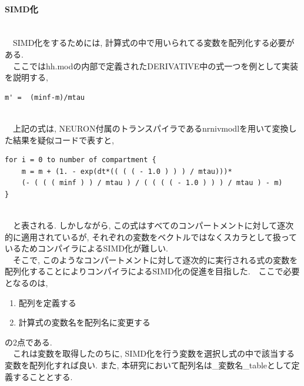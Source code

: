 \paragraph{SIMD化}~\\
　SIMD化をするためには, 計算式の中で用いられてる変数を配列化する必要がある.\\
　ここではhh.modの内部で定義されたDERIVATIVE中の式一つを例として実装を説明する,\\
\begin{table}[htb]
  \begin{center}
{\footnotesize
\begin{framed}
\begin{verbatim}
m' =  (minf-m)/mtau
\end{verbatim}
\end{framed}
}
\end{center}
\end{table}~\\
　上記の式は, NEURON付属のトランスパイラであるnrnivmodlを用いて変換した結果を疑似コードで表すと,\\
\clearpage
\begin{table}[htb]
  \begin{center}
{\footnotesize
\begin{framed}
\begin{verbatim}
for i = 0 to number of compartment {
    m = m + (1. - exp(dt*(( ( ( - 1.0 ) ) ) / mtau)))*
    (- ( ( ( minf ) ) / mtau ) / ( ( ( ( - 1.0 ) ) ) / mtau ) - m)
}
\end{verbatim}
\end{framed}
}
\end{center}
\end{table}~\\
　と表される. しかしながら, この式はすべてのコンパートメントに対して逐次的に適用されているが, それぞれの変数をベクトルではなくスカラとして扱っているためコンパイラによるSIMD化が難しい.\\
　そこで, このようなコンパートメントに対して逐次的に実行される式の変数を配列化することによりコンパイラによるSIMD化の促進を目指した.　ここで必要となるのは,
\begin{enumerate}
\item 配列を定義する
\item 計算式の変数名を配列名に変更する
\end{enumerate}
の2点である.\\
　これは変数を取得したのちに, SIMD化を行う変数を選択し式の中で該当する変数を配列化すれば良い. また, 本研究において配列名は\_変数名\_tableとして定義することとする.\\
